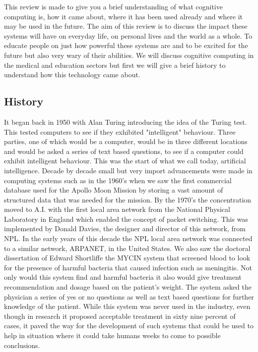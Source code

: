 \documentclass[journal]{IEEEtran}
\begin{document}
This review is made to give you a brief understanding of what cognitive computing is, how it came about, where it has been used already and where it may be used in the future. The aim of this review is to discuss the impact these systems will have on everyday life, on personal lives and the world as a whole. To educate people on just how powerful these systems are and to be excited for the future but also very wary of their abilities. We will discuss cognitive computing in the medical and education sectors but first we will give a brief history to understand how this technology came about.

\subsection{History}
It began back in 1950 with Alan Turing introducing the idea of the Turing test\cite{turing}. This tested computers to see if they exhibited "intelligent" behaviour. Three parties, one of which would be a computer, would be in three different locations and would be asked a series of text based questions, to see if a computer could exhibit intelligent behaviour. This was the start of what we call today, artificial intelligence. Decade by decade small but very import advancements were made in computing systems such as in the 1960's when we saw the first commercial database used for the Apollo Moon Mission by storing a vast amount of structured data that was needed for the mission. By the 1970's the concentration moved to A.I. with the first local area network from the National Physical Laboratory in England which enabled the concept of packet switching\cite{packet}. This was implemented by Donald Davies, the designer and director of this network, from NPL. In the early years of this decade the NPL local area network was connected to a similar network, ARPANET, in the United States. We also saw the doctoral dissertation of Edward Shortliffe the MYCIN system that screened blood to look for the presence of harmful bacteria that caused infection such as meningitis. Not only would this system find and harmful bacteria it also would give treatment recommendation and dosage based on the patient's weight. The system asked the physician a series of yes or no questions as well as text based questions for further knowledge of the patient. While this system was never used in the industry, even though in research it proposed acceptable treatment in sixty nine percent of cases, it paved the way for the development of such systems that could be used to help in situation where it could take humans weeks to come to possible conclusions.
\end{document}
